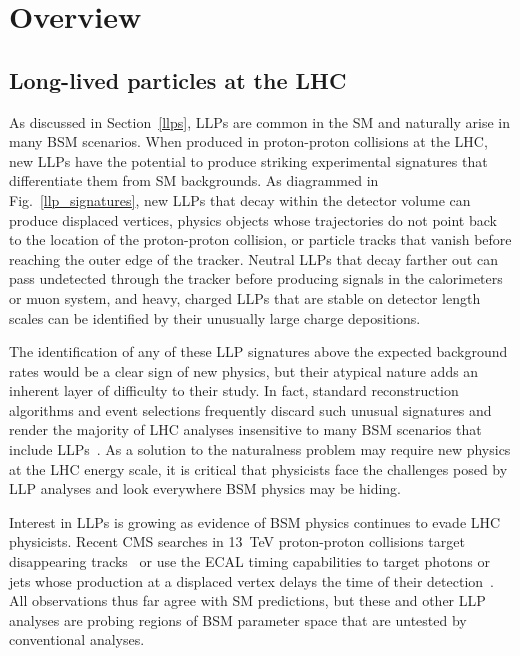 \section{Overview}
\label{overview}
\subsection{Long-lived particles at the LHC}
As discussed in Section~\ref{llps}, LLPs are common in the SM and naturally arise in many BSM scenarios. When produced in proton-proton collisions at the LHC, new LLPs have the potential to produce striking experimental signatures that differentiate them from SM backgrounds. As diagrammed in Fig.~\ref{llp_signatures}, new LLPs that decay within the detector volume can produce displaced vertices, physics objects whose trajectories do not point back to the location of the proton-proton collision, or particle tracks that vanish before reaching the outer edge of the tracker. Neutral LLPs that decay farther out can pass undetected through the tracker before producing signals in the calorimeters or muon system, and heavy, charged LLPs that are stable on detector length scales can be identified by their unusually large charge depositions.



The identification of any of these LLP signatures above the expected background rates would be a clear sign of new physics, but their atypical nature adds an inherent layer of difficulty to their study. In fact, standard reconstruction algorithms and event selections frequently discard such unusual signatures and render the majority of LHC analyses insensitive to many BSM scenarios that include LLPs~\cite{llp_whitepaper}. As a solution to the naturalness problem may require new physics at the LHC energy scale, it is critical that physicists face the challenges posed by LLP analyses and look everywhere BSM physics may be hiding.

Interest in LLPs is growing as evidence of BSM physics continues to evade LHC physicists. Recent CMS searches in \SI{13}{\TeV} proton-proton collisions target disappearing tracks~\cite{disappearing_tracks} or use the ECAL timing capabilities to target photons or jets whose production at a displaced vertex delays the time of their detection~\cite{delayed_photons, delayed_jets}. All observations thus far agree with SM predictions, but these and other LLP analyses are probing regions of BSM parameter space that are untested by conventional analyses.

